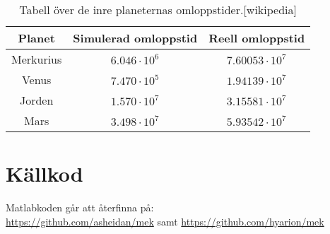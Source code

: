 \documentclass[a4]{article}
\begin{document}
\begin{table}
\begin{center}
\begin{tabular}{c|c|c}
	Planet    & Simulerad omloppstid & Reell omloppstid \\
	\hline
	Merkurius & $6.046 \cdot 10^6$ &  $7.60053 \cdot 10^7$ \\
	Venus     & $7.470 \cdot 10^5$ &  $1.94139 \cdot 10^7$ \\ 
	Jorden    & $1.570 \cdot 10^7$ &  $3.15581 \cdot 10^7$ \\
	Mars      & $3.498 \cdot 10^7$ &  $5.93542 \cdot 10^7$
\end{tabular}
\caption{
	Tabell över de inre planeternas omloppstider.[wikipedia]
}
\label{table:solarsystem:orbit:reality:check}
\end{center}
\end{table}

\section{Källkod}
	Matlabkoden går att återfinna på:\\
	\url{https://github.com/asheidan/mek} samt
	\url{https://github.com/hyarion/mek}
	
\end{document}
